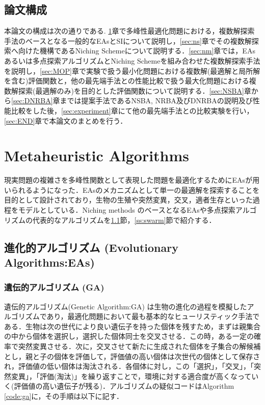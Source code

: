 \documentclass[a4j,11pt]{jarticle}
\begin{document}
\subsection{論文構成}
本論文の構成は次の通りである.
\ref{sec:MA}章で多峰性最適化問題における，複数解探索手法のベースとなる一般的なEAsとSIについて説明し，\ref{sec:ns}章でその複数解探索へ向けた機構であるNiching Schemeについて説明する．\ref{sec:nm}章では，EAsあるいは多点探索アルゴリズムとNiching Schemeを組み合わせた複数解探索手法を説明し，\ref{sec:MOP}章で実験で扱う最小化問題における複数解(最適解と局所解を含む)評価関数と，他の最先端手法との性能比較で扱う最大化問題における複数解探索(最適解のみ)を目的とした評価関数について説明する．\ref{sec:NSBA}章から\ref{sec:DNRBA}章までは提案手法であるNSBA, NRBA及びDNRBAの説明及び性能比較をした後，\ref{sec:experiment}章にて他の最先端手法との比較実験を行い，\ref{sec:END}章で本論文のまとめを行う．

\newpage
\section{Metaheuristic Algorithms}

\label{sec:MA}

現実問題の複雑さを多峰性関数として表現した問題を最適化するためにEAsが用いられるようになった．EAsのメカニズムとして単一の最適解を探索することを目的として設計されており，生物の生殖や突然変異，交叉，適者生存といった過程をモデルとしている．Niching methods のベースとなるEAsや多点探索アルゴリズムの代表的なアルゴリズムを\ref{ss:EAs}節，\ref{ss:swarm}節で紹介する．

\subsection{進化的アルゴリズム (Evolutionary Algorithms:EAs)}
\label{ss:EAs}

\subsubsection{遺伝的アルゴリズム (GA)}
\label{sss:GA}
遺伝的アルゴリズム(Genetic Algorithm:GA) \cite{GA} は生物の進化の過程を模擬したアルゴリズムであり，最適化問題において最も基本的なヒューリスティック手法である．生物は次の世代により良い遺伝子を持った個体を残すため，まずは親集合の中から個体を選択し，選択した個体同士を交叉させる．この時，ある一定の確率で突然変異させる．次に，交叉させて新たに生成された個体を子集合の解候補とし，親と子の個体を評価して，評価値の高い個体は次世代の個体として保存され，評価値の低い個体は淘汰される．各個体に対し，この「選択」，「交叉」，「突然変異」，「評価(淘汰)」を繰り返すことで，環境に対する適合度が高くなっていく(評価値の高い遺伝子が残る)．アルゴリズムの疑似コードはAlgorithm \ref{code:ga}に，その手順は以下に記す．
\end{document}
